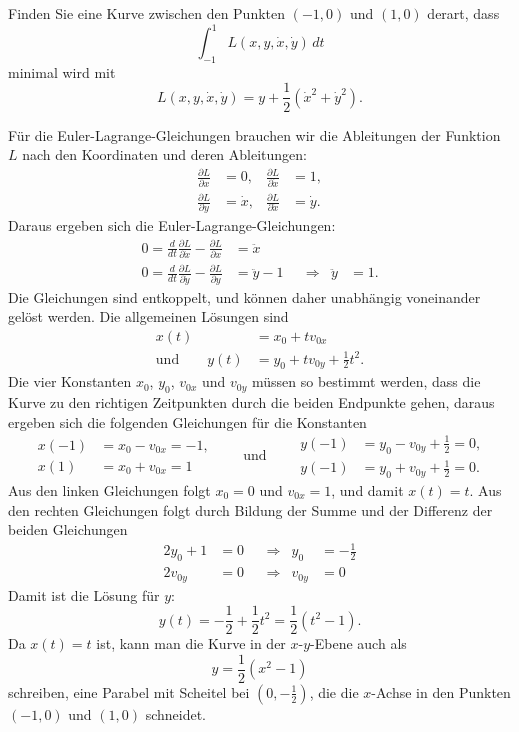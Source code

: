 Finden Sie eine Kurve zwischen den Punkten $(-1,0)$ und $(1,0)$
derart, dass 
\[
\int_{-1}^1 L(x,y,\dot x, \dot y)\,dt
\]
minimal wird mit
\[
L(x,y,\dot x, \dot y)
=
y+\frac12(\dot x^2+\dot y^2).
\]

\begin{loesung}
Für die Euler-Lagrange-Gleichungen brauchen wir die Ableitungen der
Funktion $L$ nach den Koordinaten und deren Ableitungen:
\begin{equation}
\begin{aligned}
\frac{\partial L}{\partial x}
&=
0,
&
\frac{\partial L}{\partial \dot x}
&=
1,
\\
\frac{\partial L}{\partial y}
&=
\dot x,
&
\frac{\partial L}{\partial \dot x}
&=
\dot y.
\end{aligned}
\end{equation}
Daraus ergeben sich die Euler-Lagrange-Gleichungen:
\[
\begin{aligned}
0=
\frac{d}{dt}
\frac{\partial L}{\partial\dot x}
-
\frac{\partial L}{\partial x}
&=
\ddot x
\\
0=
\frac{d}{dt}
\frac{\partial L}{\partial\dot y}
-
\frac{\partial L}{\partial y}
&=
\ddot y-1
&&\Rightarrow&
\ddot y &= 1.
\end{aligned}
\]
Die Gleichungen sind entkoppelt, und können daher unabhängig voneinander
gelöst werden.
Die allgemeinen Lösungen sind
\[
\begin{aligned}
x(t)&=x_0 + t v_{0x}
\\
\text{und}\qquad
y(t)&=y_0 + t v_{0y} + \frac12t^2.
\end{aligned}
\]
Die vier Konstanten $x_0$, $y_0$, $v_{0x}$ und $v_{0y}$ müssen so bestimmt
werden, dass die Kurve zu den richtigen Zeitpunkten durch die 
beiden Endpunkte gehen, daraus ergeben sich die folgenden Gleichungen
für die Konstanten
\[
\begin{aligned}
x(-1)&=x_0-v_{0x}=-1,
\\
x(1)&=x_0+v_{0x}=1
\end{aligned}
\qquad
\text{und}
\qquad
\begin{aligned}
y(-1)&=y_0-v_{0y}+{\textstyle \frac12}=0,
\\
y(-1)&=y_0+v_{0y}+{\textstyle \frac12}=0.
\end{aligned}
\]
Aus den linken Gleichungen folgt $x_0=0$ und $v_{0x}=1$, und
damit $x(t)=t$.
Aus den rechten Gleichungen folgt durch Bildung der Summe und der
Differenz der beiden Gleichungen
\[
\begin{aligned}
2y_0+1&=0&&\Rightarrow& y_0&=-\frac12\\
2v_{0y}&=0&&\Rightarrow& v_{0y}&=0
\end{aligned}
\]
Damit ist die Lösung für $y$:
\[
y(t) = -\frac12+\frac12t^2=\frac12(t^2-1).
\]
Da $x(t)=t$ ist, kann man die Kurve in der $x$-$y$-Ebene auch als 
\[
y=\frac12(x^2-1)
\]
schreiben, eine Parabel mit Scheitel bei $(0,-\frac12)$, die die
$x$-Achse in den Punkten $(-1,0)$ und $(1,0)$ schneidet.
\end{loesung}

